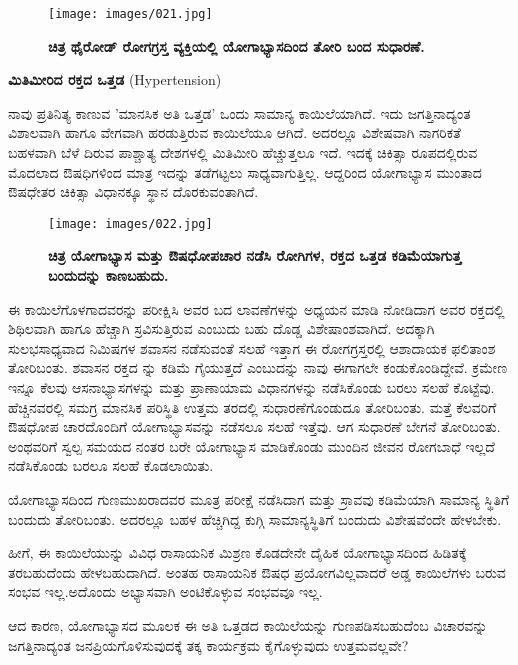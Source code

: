 \begin{figure}
\texttt{[image: images/021.jpg]}
\caption{ \textbf{ಚಿತ್ರ  ಥೈರೋಡ್ ರೋಗಗ್ರಸ್ತ ವ್ಯಕ್ತಿಯಲ್ಲಿ ಯೋಗಾಭ್ಯಾಸದಿಂದ ತೋರಿ ಬಂದ ಸುಧಾರಣೆ.} }
\end{figure}

\textbf{ಮಿತಿಮೀರಿದ ರಕ್ತದ ಒತ್ತಡ} (Hypertension)

ನಾವು ಪ್ರತಿನಿತ್ಯ ಕಾಣುವ 'ಮಾನಸಿಕ ಅತಿ ಒತ್ತಡ' ಒಂದು ಸಾಮಾನ್ಯ ಕಾಯಿಲೆಯಾಗಿದೆ. ಇದು ಜಗತ್ತಿನಾದ್ಯಂತ ವಿಶಾಲವಾಗಿ ಹಾಗೂ ವೇಗವಾಗಿ ಹರಡುತ್ತಿರುವ ಕಾಯಿಲೆಯೂ ಆಗಿದೆ. ಅದರಲ್ಲೂ ವಿಶೇಷವಾಗಿ ನಾಗರಿಕತೆ ಬಹಳವಾಗಿ ಬೆಳೆ ದಿರುವ ಪಾಶ್ಚಾತ್ಯ ದೇಶಗಳಲ್ಲಿ ಮಿತಿಮೀರಿ ಹೆಚ್ಚುತ್ತಲೂ ಇದೆ. ಇದಕ್ಕೆ ಚಿಕಿತ್ಸಾ ರೂಪದಲ್ಲಿರುವ  ಮೊದಲಾದ ಔಷಧಿಗಳಿಂದ ಮಾತ್ರ ಇದನ್ನು ತಡೆಗಟ್ಟಲು ಸಾಧ್ಯವಾಗುತ್ತಿಲ್ಲ. ಆದ್ದರಿಂದ ಯೋಗಾಭ್ಯಾಸ ಮುಂತಾದ ಔಷಧೇತರ ಚಿಕಿತ್ಸಾ ವಿಧಾನಕ್ಕೂ ಸ್ಥಾನ ದೊರಕುವಂತಾಗಿದೆ.

\begin{figure}
\texttt{[image: images/022.jpg]}
\caption{ \textbf{ಚಿತ್ರ  ಯೋಗಾಭ್ಯಾಸ ಮತ್ತು ಔಷಧೋಪಚಾರ ನಡೆಸಿ ರೋಗಿಗಳ, ರಕ್ತದ ಒತ್ತಡ ಕಡಿಮೆಯಾಗುತ್ತ ಬಂದುದನ್ನು ಕಾಣಬಹುದು.} }
\end{figure}

ಈ ಕಾಯಿಲೆಗೊಳಗಾದವರನ್ನು ಪರೀಕ್ಷಿಸಿ ಅವರ  ಬದ ಲಾವಣೆಗಳನ್ನು ಅಧ್ಯಯನ ಮಾಡಿ ನೋಡಿದಾಗ ಅವರ ರಕ್ತದಲ್ಲಿ ಶಿಥಿಲವಾಗಿ ಹಾಗೂ ಹೆಚ್ಚಾಗಿ ಸ್ರವಿಸುತ್ತಿರುವ  ಎಂಬುದು ಬಹು ದೊಡ್ಡ ವಿಶೇಷಾಂಶವಾಗಿದೆ. ಅದಕ್ಕಾಗಿ ಸುಲಭಸಾಧ್ಯವಾದ  ನಿಮಿಷಗಳ ಶವಾಸನ ನಡೆಸುವಂತೆ ಸಲಹೆ ಇತ್ತಾಗ ಈ ರೋಗಗ್ರಸ್ತರಲ್ಲಿ ಆಶಾದಾಯಕ ಫಲಿತಾಂಶ ತೋರಿಬಂತು. ಶವಾಸನ ರಕ್ತದ  ನ್ನು ಕಡಿಮೆ ಗೈಯುತ್ತದೆ ಎಂಬುದನ್ನು ನಾವು ಈಗಾಗಲೇ ಕಂಡುಕೊಂಡಿದ್ದೇವೆ. ಕ್ರಮೇಣ ಇನ್ನೂ ಕೆಲವು ಆಸನಾಭ್ಯಾಸಗಳನ್ನು ಮತ್ತು ಪ್ರಾಣಾಯಾಮ ವಿಧಾನಗಳನ್ನು ನಡೆಸಿಕೊಂಡು ಬರಲು ಸಲಹೆ ಕೊಟ್ಟೆವು. ಹೆಚ್ಚಿನವರಲ್ಲಿ ಸಮಗ್ರ ಮಾನಸಿಕ ಪರಿಸ್ಥಿತಿ ಉತ್ತಮ ತರದಲ್ಲಿ ಸುಧಾರಣೆಗೊಂಡುದೂ ತೋರಿಬಂತು. ಮತ್ತೆ ಕೆಲವರಿಗೆ ಔಷಧೋಪ ಚಾರದೊಂದಿಗೆ ಯೋಗಾಭ್ಯಾಸವನ್ನು ನಡೆಸಲೂ ಸಲಹೆ ಇತ್ತೆವು. ಆಗ ಸುಧಾರಣೆ ಬೇಗನೆ ತೋರಿಬಂತು. ಅಂಥವರಿಗೆ ಸ್ವಲ್ಪ ಸಮಯದ ನಂತರ ಬರೇ ಯೋಗಾಭ್ಯಾಸ ಮಾಡಿಕೊಂಡು ಮುಂದಿನ ಜೀವನ ರೋಗಬಾಧೆ ಇಲ್ಲದೆ ನಡೆಸಿಕೊಂಡು ಬರಲೂ ಸಲಹೆ ಕೊಡಲಾಯಿತು.

ಯೋಗಾಭ್ಯಾಸದಿಂದ ಗುಣಮುಖರಾದವರ ಮೂತ್ರ ಪರೀಕ್ಷೆ ನಡೆಸಿದಾಗ  ಮತ್ತು  ಸ್ರಾವವು ಕಡಿಮೆಯಾಗಿ ಸಾಮಾನ್ಯ ಸ್ಥಿತಿಗೆ ಬಂದುದು ತೋರಿಬಂತು. ಅದರಲ್ಲೂ ಬಹಳ ಹೆಚ್ಚಿಗಿದ್ದ  ಕುಗ್ಗಿ ಸಾಮಾನ್ಯಸ್ಥಿತಿಗೆ ಬಂದುದು ವಿಶೇಷವೆಂದೇ ಹೇಳಬೇಕು.

ಹೀಗೆ, ಈ ಕಾಯಿಲೆಯುನ್ನು ವಿವಿಧ ರಾಸಾಯನಿಕ ಮಿಶ್ರಣ ಕೊಡದೇನೇ ದೈಹಿಕ ಯೋಗಾಭ್ಯಾಸದಿಂದ ಹಿಡಿತಕ್ಕೆ ತರಬಹುದೆಂದು ಹೇಳಬಹುದಾಗಿದೆ. ಅಂತಹ ರಾಸಾಯನಿಕ ಔಷಧ ಪ್ರಯೋಗವಿಲ್ಲವಾದರೆ ಅಡ್ಡ ಕಾಯಿಲೆಗಳು ಬರುವ ಸಂಭವ ಇಲ್ಲ.ಅದೊಂದು ಅಭ್ಯಾಸವಾಗಿ ಅಂಟಿಕೊಳ್ಳುವ ಸಂಭವವೂ ಇಲ್ಲ.

ಆದ ಕಾರಣ, ಯೋಗಾಭ್ಯಾಸದ ಮೂಲಕ ಈ ಅತಿ ಒತ್ತಡದ ಕಾಯಿಲೆಯನ್ನು ಗುಣಪಡಿಸಬಹುದೆಂಬ ವಿಚಾರವನ್ನು ಜಗತ್ತಿನಾದ್ಯಂತ ಜನಪ್ರಿಯಗೊಳಿಸುವುದಕ್ಕೆ ತಕ್ಕ ಕಾರ್ಯಕ್ರಮ ಕೈಗೊಳ್ಳುವುದು ಉತ್ತಮವಲ್ಲವೇ?

